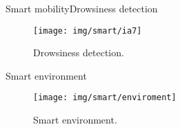 \documentclass[10pt]{beamer}
\newcommand{\chref}[2]{	\href{#1}{{\usebeamercolor[bg]{Feather}#2}}}
\newcommand{\chref}[3][blue]{\href{#2}{\color{#1}{#3}}}%
\newcommand{\1}{
        	\setbeamertemplate{background}{
        		\texttt{[image: img/1]}
        		\tikz[overlay] \fill[fill opacity=0.75,fill=white] (0,0) rectangle (-\paperwidth,\paperheight);
        	}
}
\begin{document}
\begin{frame}{Smart mobility}{Drowsiness detection}
	\begin{figure}[]
		\centering
		\texttt{[image: img/smart/ia7]}
		\label{img:mot2}
		\caption{Drowsiness detection.}
	\end{figure}
\end{frame}


\begin{frame}{Smart environment}{}
	\begin{figure}
		\texttt{[image: img/smart/enviroment]}
		\caption{Smart environment.}
	\end{figure}
\end{frame}








\end{document}
